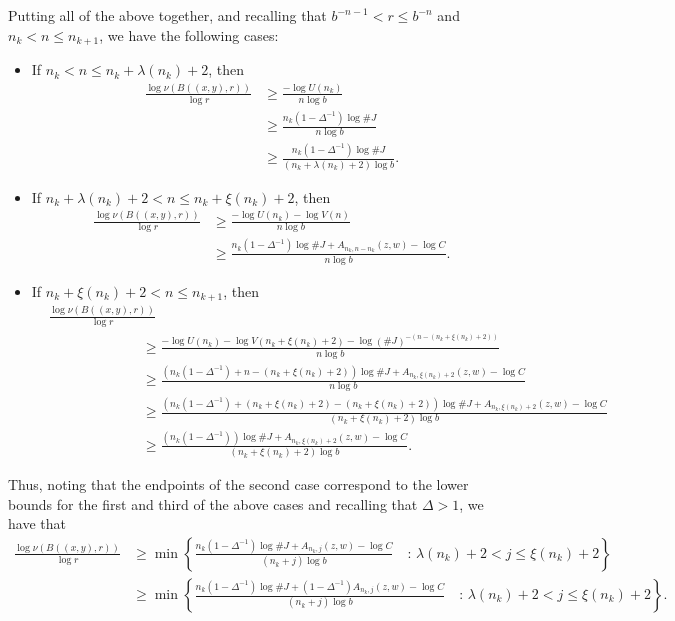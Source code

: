 \documentclass[12pt]{article}
\theoremstyle{remark}
\numberwithin{equation}{section}
\newcommand{\0}{\mathbf{0}}
\begin{document}
Putting all of the above together, and recalling that $b^{-n-1} < r \leq b^{-n}$ and $n_{k} < n \leq n_{k+1}$, we have the following cases:
\begin{itemize}
\item If $n_{k}<n \leq n_{k}+\lambda(n_{k})+2$, then
\begin{align*}
\frac{\log \nu(B((x,y),r))}{\log r} &\geq \frac{-\log U(n_{k})}{n\log b} \\[1ex] 
                                    &\geq  \frac{n_{k}(1-\Delta^{-1})\log\#J}{n\log b} \\[1ex]
                                    &\geq \frac{n_{k}(1-\Delta^{-1})\log\#J}{(n_k + \lambda(n_k) + 2)\log b}.
\end{align*}
\item If $n_{k}+\lambda(n_{k})+2<n \leq n_{k}+\xi(n_{k})+2$, then 
\begin{align*}
\frac{\log \nu(B((x,y),r))}{\log r} &\geq \frac{-\log U(n_{k}) - \log V(n)}{n\log b} \\ 
&\geq  \frac{n_{k}(1-\Delta^{-1})\log\#J + A_{n_{k},n-n_k}(z,w) -\log C}{n\log b}.
\end{align*}
\item If $n_{k}+\xi(n_{k})+2<n \leq n_{k+1}$, then 
\begin{align*}
&\frac{\log \nu(B((x,y),r))}{\log r} \\
&\phantom{=====}\geq \frac{-\log U(n_{k}) - \log V(n_{k}+\xi(n_{k})+2) - \log(\#J)^{-(n-(n_{k}+\xi(n_{k})+2))}}{n\log b}\\[1ex]
&\phantom{=====} \geq \frac{(n_{k}(1-\Delta^{-1})+n-(n_{k}+\xi(n_{k})+2) )\log\#J + A_{n_{k}, \xi(n_{k}) +2}(z,w) -\log C}{ n \log b} \\[1ex]
&\phantom{=====} \geq \frac{(n_{k}(1-\Delta^{-1})+(n_k + \xi(n_k) + 2)-(n_{k}+\xi(n_{k})+2) )\log\#J + A_{n_{k}, \xi(n_{k}) +2}(z,w) -\log C}{ (n_k + \xi(n_k) + 2) \log b} \\[1ex]
&\phantom{=====} \geq \frac{(n_{k}(1-\Delta^{-1}))\log\#J + A_{n_{k}, \xi(n_{k}) +2}(z,w) -\log C}{ (n_k + \xi(n_k) + 2) \log b}.
\end{align*}
\end{itemize} 
Thus, noting that the endpoints of the second case correspond to the lower bounds for the first and third of the above cases and recalling that $\Delta > 1$, we have that 
 \begin{align*}
\frac{\log \nu(B((x,y),r))}{\log r} &\geq \min \left\{  \frac{n_{k}(1-\Delta^{-1})\log\#J + A_{n_{k},j}(z,w)-\log C}{(n_{k}+j)\log b} \quad : \, \lambda(n_{k})+2<j \leq \xi(n_{k})+2 \right\} \\[1ex]
                                    &\geq \min \left\{  \frac{n_{k}(1-\Delta^{-1})\log\#J + (1-\Delta^{-1})A_{n_{k},j}(z,w)-\log C}{(n_{k}+j)\log b} \quad : \, \lambda(n_{k})+2<j \leq \xi(n_{k})+2 \right\}.
 \end{align*}
\end{document}
